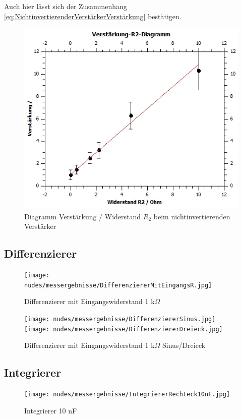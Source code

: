 \documentclass[12pt,a4paper,twoside]{article}
\begin{document}
\noindent
Auch hier lässt sich der Zusammenhang \ref{eq:NichtinvertierenderVerstärkerVerstärkung} bestätigen.

\begin{figure}[H]
    \centering
    \includegraphics[width=0.5\linewidth]{nudes/NivVerstärkungR2Diagramm.jpg}
    \caption{Diagramm Verstärkung / Widerstand $R_{2}$ beim nichtinvertierenden Verstärker}
    \label{fig:Verstärkung/R2NIVAW}
\end{figure}

\subsection{Differenzierer}

\begin{figure}[H]
    \centering
    \texttt{[image: nudes/messergebnisse/DifferenziererMitEingangsR.jpg]}
    \caption{Differenzierer mit Eingangswiderstand 1 k$\Omega$}
    \label{fig:Differenzierer1R1AW}
\end{figure}

\begin{figure}[H]
    \centering
    \texttt{[image: nudes/messergebnisse/DifferenziererSinus.jpg]}
    \texttt{[image: nudes/messergebnisse/DifferenziererDreieck.jpg]}
    \caption{Differenzierer mit Eingangswiderstand 1 k$\Omega$ Sinus/Dreieck}
    \label{fig:Differenzierer1R1Sinus/DreieckAW}
\end{figure}

\subsection{Integrierer}

\begin{figure}[H]
    \centering
    \texttt{[image: nudes/messergebnisse/IntegriererRechteck10nF.jpg]}
    \caption{Integrierer 10 nF}
    \label{fig:IntegriererResultat1AW}
\end{figure}
\end{document}
